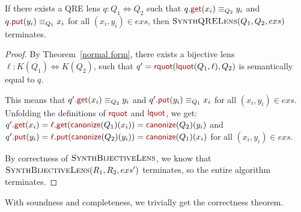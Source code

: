 \documentclass[acmsmall,review,anonymous]{acmart}
\newcommand{\kw}[1]{\textcolor{dkred}{\ensuremath{\mathsf{#1}}}}
\newcommand{\canonize}{\ensuremath{\kw{canonize}}}
\newcommand{\get}{\ensuremath{\kw{get}}}
\newcommand{\lput}{\ensuremath{\kw{put}}}
\newcommand{\lquot}{\ensuremath{\kw{lquot}}}
\newcommand{\rquot}{\ensuremath{\kw{rquot}}}
\begin{document}
\begin{lemma}
  If there exists a QRE lens $q : Q_1 \Leftrightarrow Q_2$ such that
  $q.\get(x_i) \equiv_{Q_2} y_i$ and $q.\lput(y_i) \equiv_{Q_1} x_i$ for all
  $(x_i,y_i)\in exs$, then $\textproc{SynthQRELens}(Q_1,Q_2,exs)$ terminates.
\end{lemma}
\begin{proof}
  By Theorem~\ref{normal form}, there exists a bijective lens $\ell : K(Q_1)
  \Leftrightarrow K(Q_2)$, such that $q' = \rquot(\lquot(Q_1, \ell), Q_2)$ is
  semantically equal to $q$.

  This means that $q'.\get(x_i) \equiv_{Q_2} y_i$ and $q'.\lput(y_i)
  \equiv_{Q_1} x_i$ for all $(x_i,y_i)\in exs$. Unfolding the definitions of
  $\rquot$ and $\lquot$, we get:\\
  $q'.\get(x_i) = \ell.\get(\canonize(Q_1)(x_i)) = \canonize(Q_2)(y_i)$ and\\
  $q'.\lput(y_i) = \ell.\lput(\canonize(Q_2)(y_i)) = \canonize(Q_1)(x_i)$ for all
  $(x_i,y_i)\in exs$.

  By correctness of $\textproc{SynthBijectiveLens}$, we know that
  $\Call{SynthBijectiveLens}{R_1,R_2,exs'}$ terminates, so the entire algorithm
  terminates. 
\end{proof}

With soundness and completeness, we trivially get the correctness theorem.
\end{document}
